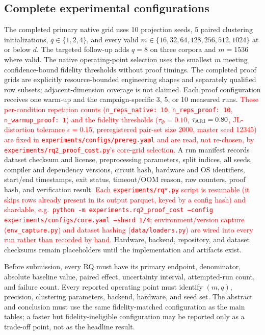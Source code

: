 \documentclass[pdflatex,sn-mathphys-num,iicol]{sn-jnl}
\newcommand{\newtext}[1]{\textcolor{red}{#1}}
\newcommand{\tpexplain}[1]{}
\theoremstyle{plain}
\theoremstyle{definition}
\theoremstyle{remark}
\begin{document}
\begin{appendices}
\section{Complete experimental configurations}
\tpexplain{Provide every hyperparameter, dataset checksum, preprocessing choice, command, hardware/software version, and excluded/failed run.}
The completed primary native grid uses 10 projection seeds, 5 paired clustering initializations, $q\in\{1,2,4\}$, and every valid $m\in\{16,32,64,128,256,512,1024\}$ at or below $d$. The targeted follow-up adds $q=8$ on three corpora and $m=1536$ where valid. The native operating-point selection uses the smallest $m$ meeting confidence-bound fidelity thresholds without proof timings. The completed proof grids are explicitly resource-bounded engineering shapes and separately qualified row subsets; adjacent-dimension coverage is not claimed. Each proof configuration receives one warm-up and the campaign-specific 3, 5, or 10 measured runs. \newtext{These per-condition repetition counts (\texttt{n\_reps\_native: 10}, \texttt{n\_reps\_proof: 10}, \texttt{n\_warmup\_proof: 1}) and the fidelity thresholds ($\tau_\Phi=0.10$, $\tau_{\rm ARI}=0.80$, JL-distortion tolerance $\epsilon=0.15$, preregistered pair-set size 2000, master seed 12345) are fixed in \texttt{experiments/configs/prereg.yaml} and are read, not re-chosen, by \texttt{experiments/rq2\_proof\_cost.py}'s core-grid selection.} A run manifest records dataset checksum and license, preprocessing parameters, split indices, all seeds, compiler and dependency versions, circuit hash, hardware and OS identifiers, start/end timestamps, exit status, timeout/OOM reason, raw counters, proof hash, and verification result. \newtext{Each \texttt{experiments/rq*.py} script is resumable (it skips rows already present in its output parquet, keyed by a config hash) and shardable, e.g.\ \texttt{python -m experiments.rq2\_proof\_cost --config experiments/configs/core.yaml --shard 1/4}; environment/version capture (\texttt{env\_capture.py}) and dataset hashing (\texttt{data/loaders.py}) are wired into every run rather than recorded by hand.} Hardware, backend, repository, and dataset checksums remain placeholders until the implementation and artifacts exist.

Before submission, every RQ must have its primary endpoint, denominator, absolute baseline value, paired effect, uncertainty interval, attempted-run count, and failure count. Every reported operating point must identify $(m,q)$, precision, clustering parameters, backend, hardware, and seed set. The abstract and conclusion must use the same fidelity-matched configuration as the main tables; a faster but fidelity-ineligible configuration may be reported only as a trade-off point, not as the headline result.
\end{appendices}
\end{document}
